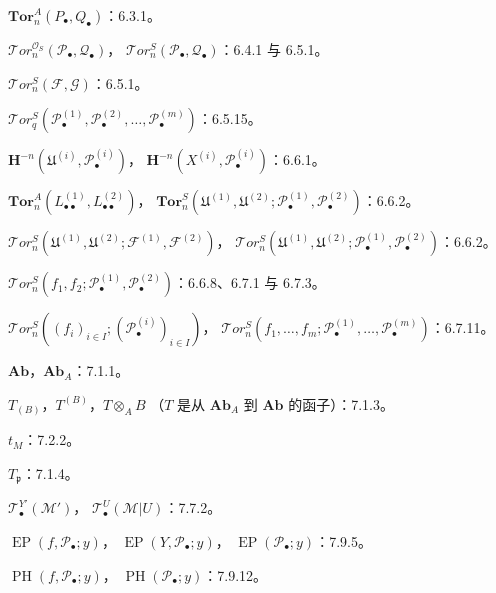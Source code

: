 \documentclass[UTF8,fontset=none,11pt,oneside,openany]{ctexbook}
\begin{document}
\begin{flushleft}
$\mathbf{Tor}_n^A(P_\bullet,Q_\bullet)$：6.3.1。

\medskip
$\mathscr{T}\!or_n^{\mathscr O_S}(\mathscr P_\bullet,\mathscr Q_\bullet)$，
$\mathscr{T}\!or_n^S(\mathscr P_\bullet,\mathscr Q_\bullet)$：6.4.1 与 6.5.1。

\medskip
$\mathscr{T}\!or_n^S(\mathscr F,\mathscr G)$：6.5.1。

\medskip
$\mathscr{T}\!or_q^S(\mathscr P_\bullet^{(1)},\mathscr P_\bullet^{(2)},\ldots,
\mathscr P_\bullet^{(m)})$：6.5.15。

\medskip
$\mathbf H^{-n}(\mathfrak U^{(i)},\mathscr P_\bullet^{(i)})$，
$\mathbf H^{-n}(X^{(i)},\mathscr P_\bullet^{(i)})$：6.6.1。

\medskip
$\mathbf{Tor}_n^A(L_{\bullet\bullet}^{(1)},L_{\bullet\bullet}^{(2)})$，
$\mathbf{Tor}_n^S(\mathfrak U^{(1)},\mathfrak U^{(2)};
\mathscr P_\bullet^{(1)},\mathscr P_\bullet^{(2)})$：6.6.2。

\medskip
$\mathscr{T}\!or_n^S(\mathfrak U^{(1)},\mathfrak U^{(2)};
\mathscr F^{(1)},\mathscr F^{(2)})$，
$\mathscr{T}\!or_n^S(\mathfrak U^{(1)},\mathfrak U^{(2)};
\mathscr P_\bullet^{(1)},\mathscr P_\bullet^{(2)})$：6.6.2。

\medskip
$\mathscr{T}\!or_n^S(f_1,f_2;\mathscr P_\bullet^{(1)},
\mathscr P_\bullet^{(2)})$：6.6.8、6.7.1 与 6.7.3。

\medskip
$\mathscr{T}\!or_n^S((f_i)_{i\in I};(\mathscr P_\bullet^{(i)})_{i\in I})$，
$\mathscr{T}\!or_n^S(f_1,\ldots,f_m;\mathscr P_\bullet^{(1)},\ldots,
\mathscr P_\bullet^{(m)})$：6.7.11。

\medskip
$\mathbf{Ab}$，$\mathbf{Ab}_A$：7.1.1。

\medskip
$T_{(B)}$，$T^{(B)}$，$T\otimes_A B$
（$T$ 是从 $\mathbf{Ab}_A$ 到 $\mathbf{Ab}$ 的函子）：7.1.3。

\medskip
$t_M$：7.2.2。

\medskip
$T_{\mathfrak p}$：7.1.4。

\medskip
$\mathscr T_\bullet^{Y'}(\mathscr M')$，
$\mathscr T_\bullet^U(\mathscr M|U)$：7.7.2。

\medskip
$\operatorname{EP}(f,\mathscr P_\bullet;y)$，
$\operatorname{EP}(Y,\mathscr P_\bullet;y)$，
$\operatorname{EP}(\mathscr P_\bullet;y)$：7.9.5。

\medskip
$\operatorname{PH}(f,\mathscr P_\bullet;y)$，
$\operatorname{PH}(\mathscr P_\bullet;y)$：7.9.12。
\end{flushleft}
\end{document}
